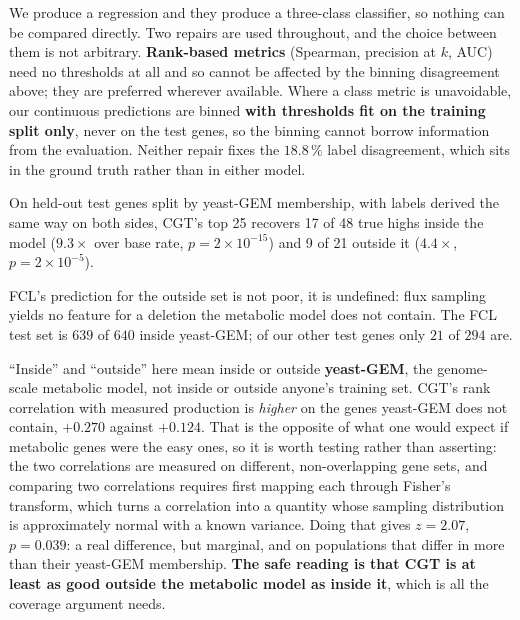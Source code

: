  We produce a regression and they
produce a three-class classifier, so nothing can be compared directly. Two repairs are used
throughout, and the choice between them is not arbitrary. \textbf{Rank-based metrics}
(Spearman, precision at $k$, AUC) need no thresholds at all and so cannot be affected by the
binning disagreement above; they are preferred wherever available. Where a class metric is
unavoidable, our continuous predictions are binned \textbf{with thresholds fit on the
training split only}, never on the test genes, so the binning cannot borrow information from
the evaluation. Neither repair fixes the $18.8\,\%$ label disagreement, which sits in the
ground truth rather than in either model.

On held-out test genes split by yeast-GEM membership, with labels derived the same way on
both sides, CGT's top 25 recovers 17 of 48 true highs inside the model ($9.3\times$ over
base rate, $p = 2\times10^{-15}$) and 9 of 21 outside it ($4.4\times$,
$p = 2\times10^{-5}$).

FCL's prediction for the outside set is not poor, it is undefined: flux sampling yields no
feature for a deletion the metabolic model does not contain. The FCL test set is $639$ of
$640$ inside yeast-GEM; of our other test genes only $21$ of $294$ are.

 ``Inside'' and ``outside'' here
mean inside or outside \textbf{yeast-GEM}, the genome-scale metabolic model, not inside or
outside anyone's training set. CGT's rank correlation with measured production is
\emph{higher} on the genes yeast-GEM does not contain, $+0.270$ against $+0.124$. That is the
opposite of what one would expect if metabolic genes were the easy ones, so it is worth
testing rather than asserting: the two correlations are measured on different,
non-overlapping gene sets, and comparing two correlations requires first mapping each
through Fisher's transform, which turns a correlation into a quantity whose sampling
distribution is approximately normal with a known variance. Doing that gives $z = 2.07$,
$p = 0.039$: a real difference, but marginal, and on populations that differ in more than
their yeast-GEM membership. \textbf{The safe reading is that CGT is at least as good outside
the metabolic model as inside it}, which is all the coverage argument needs.

